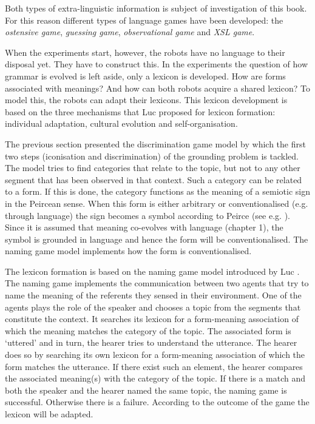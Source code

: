 Both types of extra-linguistic information is subject of investigation of this book. For this reason different types of language games have been developed: the {\em ostensive game}, {\em guessing game}, {\em observational game} and {\em XSL game}.


When the experiments start, however, the robots have no language to their disposal yet. They have to construct this. In the experiments the question of how grammar is evolved is left aside, only a lexicon is developed. How are forms associated with meanings? And how can both robots acquire a shared lexicon? To model this, the robots can adapt their lexicons. This lexicon development is based on the three mechanisms that Luc \citet{steels:1996a} proposed for lexicon formation: individual adaptation, cultural evolution and self-organisation.

The previous section presented the discrimination game model by which the first two steps (iconisation and discrimination) of the grounding problem is tackled. The model tries to find categories that relate to the topic, but not to any other segment that has been observed in that context. Such a category can be related to a form. If this is done, the category functions as the meaning of a semiotic sign in the Peircean sense. When this form is either arbitrary or conventionalised (e.g. through language) the sign becomes a symbol according to Peirce (see e.g. \citep{chandler:1994}). Since it is assumed that meaning co-evolves with language (chapter 1), the symbol is grounded in language and hence the form will be conventionalised. The naming game model implements how the form is conventionalised.

The lexicon formation is based on the naming game model introduced by Luc \citet{steels:1996a}. The naming game implements the communication between two agents that try to name the meaning of the referents they sensed in their environment. One of the agents plays the role of the speaker and chooses a topic from the segments that constitute the context. It searches its lexicon for a form-meaning association of which the meaning matches the category of the topic. The associated form is `uttered' and in turn, the hearer tries to understand the utterance. The hearer does so by searching its own lexicon for a form-meaning association of which the form matches the utterance. If there exist such an element, the hearer compares the associated meaning(s) with the category of the topic. If there is a match and both the speaker and the hearer named the same topic, the naming game is successful. Otherwise there is a failure. According to the outcome of the game the lexicon will be adapted. 

